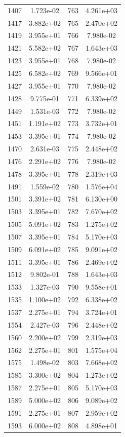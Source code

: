 \documentclass[12pt]{article}
\begin{document}
\begin{longtable}{@{}cccc@{}}
1407 & 1.723e-02 & 763 & 4.261e+03 \\
1417 & 3.882e+02 & 765 & 2.470e+02 \\
1419 & 3.955e+01 & 766 & 7.980e-02 \\
1421 & 5.582e+02 & 767 & 1.643e+03 \\
1423 & 3.955e+01 & 768 & 7.980e-02 \\
1425 & 6.582e+02 & 769 & 9.566e+01 \\
1427 & 3.955e+01 & 770 & 7.980e-02 \\
1428 & 9.775e-01 & 771 & 6.339e+02 \\
1449 & 1.531e-03 & 772 & 7.980e-02 \\
1451 & 1.191e+02 & 773 & 3.732e+01 \\
1453 & 3.395e+01 & 774 & 7.980e-02 \\
1470 & 2.631e-03 & 775 & 2.448e+02 \\
1476 & 2.291e+02 & 776 & 7.980e-02 \\
1478 & 3.395e+01 & 778 & 2.319e+03 \\
1491 & 1.559e-02 & 780 & 1.576e+04 \\
1501 & 3.391e+02 & 781 & 6.130e+00 \\
1503 & 3.395e+01 & 782 & 7.670e+02 \\
1505 & 5.091e+02 & 783 & 1.275e+02 \\
1507 & 3.395e+01 & 784 & 5.170e+03 \\
1509 & 6.091e+02 & 785 & 9.091e+02 \\
1511 & 3.395e+01 & 786 & 2.469e+02 \\
1512 & 9.802e-01 & 788 & 1.643e+03 \\
1533 & 1.327e-03 & 790 & 9.558e+01 \\
1535 & 1.100e+02 & 792 & 6.338e+02 \\
1537 & 2.275e+01 & 794 & 3.724e+01 \\
1554 & 2.427e-03 & 796 & 2.448e+02 \\
1560 & 2.200e+02 & 799 & 2.319e+03 \\
1562 & 2.275e+01 & 801 & 1.575e+04 \\
1575 & 1.498e-02 & 803 & 7.668e+02 \\
1585 & 3.300e+02 & 804 & 1.273e+02 \\
1587 & 2.275e+01 & 805 & 5.170e+03 \\
1589 & 5.000e+02 & 806 & 9.089e+02 \\
1591 & 2.275e+01 & 807 & 2.959e+02 \\
1593 & 6.000e+02 & 808 & 4.898e+01 \\

\end{longtable}
\end{document}
